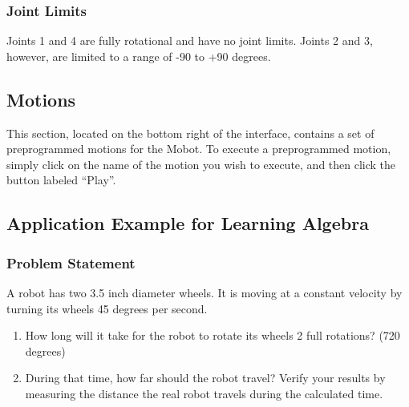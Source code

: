 \documentclass{article}
\begin{document}
\subsubsection{Joint Limits}
Joints 1 and 4 are fully rotational and have no joint limits. Joints 2 and 3, however, are 
limited to a range of -90 to +90 degrees.

\subsection{Motions}
This section, located on the bottom right of the interface, contains a set of
preprogrammed motions for the Mobot. To execute a preprogrammed motion, simply
click on the name of the motion you wish to execute, and then click the button
labeled ``Play''.

\subsection{Application Example for Learning Algebra}
\subsubsection{Problem Statement}
A robot has two 3.5 inch diameter wheels. It is moving at a constant velocity
by turning its wheels 45 degrees per second. 
\begin{enumerate}
\item How long will it take for the robot to rotate its wheels 2 full rotations? (720 degrees)
\item During that time, how far should the robot travel? Verify your results by measuring
the distance the real robot travels during the calculated time.
\end{enumerate}
\end{document}
